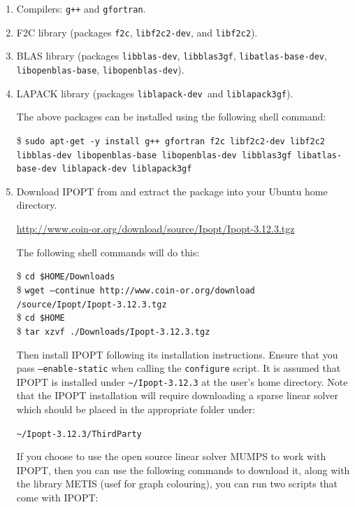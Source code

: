 \documentclass[a4paper,11pt]{report}    %
\newcommand{\shell}[1]{\$ \texttt{#1}\\}
\newcommand{\shellcont}[1]{\texttt{#1}\\}
\newenvironment{shadedframe}{%
  \def\FrameCommand{\fcolorbox{black}{shadecolor}}%
  \MakeFramed {\FrameRestore}}
{\endMakeFramed}
\begin{document}
\begin{enumerate}

\item Compilers: \texttt{g++} and \texttt{gfortran}.

\item  F2C library  (packages 
\texttt{f2c}, \texttt{libf2c2-dev}, and \texttt{libf2c2}).

\item BLAS library (packages
\texttt{libblas-dev}, \texttt{libblas3gf}, \texttt{libatlas-base-dev}, \texttt{libopenblas-base}, \texttt{libopenblas-dev}).

\item LAPACK library (packages
\texttt{liblapack-dev }and \texttt{liblapack3gf}).

The above packages can be installed using the following shell command:

\begin{shadedframe}
\shell{sudo apt-get -y install g++ gfortran f2c libf2c2-dev libf2c2 libblas-dev libopenblas-base libopenblas-dev libblas3gf libatlas-base-dev liblapack-dev liblapack3gf}
\end{shadedframe}

\item Download IPOPT from and extract the package into your Ubuntu home directory.

\small
\href{http://www.coin-or.org/download/source/Ipopt/Ipopt-3.12.3.tgz}{http://www.coin-or.org/download/source/Ipopt/Ipopt-3.12.3.tgz}
\normalsize

The following shell commands will do this:

\begin{shadedframe}
\shell{cd \$HOME/Downloads}
\shell{wget --continue http://www.coin-or.org/download} \shellcont{/source/Ipopt/Ipopt-3.12.3.tgz}
\shell{cd \$HOME}
\shell{tar xzvf ./Downloads/Ipopt-3.12.3.tgz}
\end{shadedframe}

\noindent Then install IPOPT following its installation instructions. Ensure that you pass \texttt{--enable-static} when calling the \texttt{configure} script. It is assumed that IPOPT is installed under \verb|~/Ipopt-3.12.3| at the user's home directory.
Note that the IPOPT installation will require downloading a sparse linear solver which should be placed in
the appropriate folder under:

\verb|~/Ipopt-3.12.3/ThirdParty|

If you choose to use the open source linear solver MUMPS to work with IPOPT, then you can use the following commands to download it, along with the library METIS (usef for graph colouring), you can run two scripts that come with IPOPT:


\end{enumerate}
\end{document}
